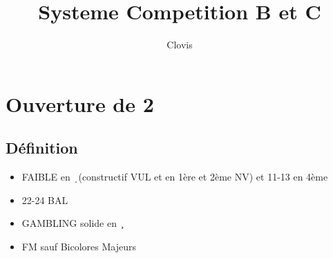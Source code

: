 \documentclass[a4paper]{article}
\title{Systeme Competition B et C}
\author{Clovis}
\begin{document}
\maketitle
\tableofcontents

\section{Ouverture de 2\pdfc}

\subsection{Définition}

\begin{itemize}
\item FAIBLE en \d\ (constructif VUL et en 1ère et 2ème NV) et 11-13 en 4ème

\item 22-24 BAL

\item GAMBLING solide en \c\ 

\item FM sauf Bicolores Majeurs

\end{itemize}
\end{document}
